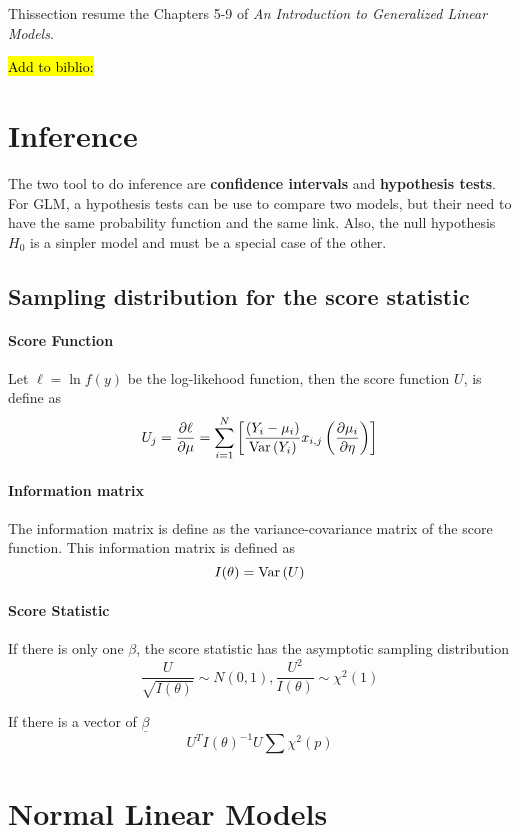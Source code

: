 { \color{red} Thissection resume the Chapters 5-9 of \emph{An Introduction to Generalized Linear Models}.}

\hl{Add to biblio:}

\section{Inference}

The two tool to do inference are \textbf{confidence intervals} and \textbf{hypothesis tests}. For GLM, a hypothesis tests can be use to compare two models, but their need to have the same probability function and the same link. Also, the null hypothesis $H_0$ is a sinpler model and must be a special case of the other. 

\subsection{Sampling distribution for the score statistic}
\paragraph{Score Function}
Let $\ell = \ln f(y)$ be the log-likehood function, then the score function $U$, is define as
\[ U_j = \frac{\partial \ell}{\partial \mu} = \sum_{i=1}^N \left[ \frac{(Y_i - \mu_i)}{\mathrm{Var} \left( Y_i \right)} x_{i,j} \left( \frac{\partial \mu_i}{\partial \eta} \right) \right] \]

\paragraph{Information matrix}
The information matrix is define as the variance-covariance matrix of the score function. This information matrix is defined as 
\[ I(\theta) = \mathrm{Var} \left( U \right) \]

\paragraph{Score Statistic}
If there is only one $\beta$, the score statistic has the asymptotic sampling distribution
\[ \frac{U}{\sqrt{I(\theta)}} \sim N(0, 1),  \frac{U^2}{I(\theta)} \sim \chi^2(1) \]

If there is a vector of $\underline{\beta}$
\[ U^T I(\theta)^{-1} U \sum \chi^2(p) \]

\section{Normal Linear Models}
